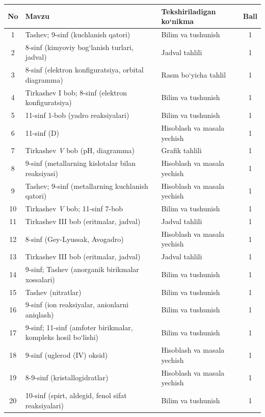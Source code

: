 \documentclass[11pt,a4paper]{article}
\begin{document}
{\small\noindent\begin{longtable}{|c|p{7.2cm}|p{5.4cm}|c|}\hline \textbf{No} & \textbf{Mavzu} & \textbf{Tekshiriladigan ko`nikma} & \textbf{Ball}\\\hline
1 & Tashev; 9-sinf (kuchlanish qatori) & Bilim va tushunish & 1\\\hline
2 & 8-sinf (kimyoviy bog`lanish turlari, jadval) & Jadval tahlili & 1\\\hline
3 & 8-sinf (elektron konfiguratsiya, orbital diagramma) & Rasm bo`yicha tahlil & 1\\\hline
4 & Tirkashev I bob; 8-sinf (elektron konfiguratsiya) & Bilim va tushunish & 1\\\hline
5 & 11-sinf 1-bob (yadro reaksiyalari) & Bilim va tushunish & 1\\\hline
6 & 11-sinf (D) & Hisoblash va masala yechish & 1\\\hline
7 & Tirkashev \textit{V} bob (pH, diagramma) & Grafik tahlili & 1\\\hline
8 & 9-sinf (metallarning kislotalar bilan reaksiyasi) & Hisoblash va masala yechish & 1\\\hline
9 & Tashev; 9-sinf (metallarning kuchlanish qatori) & Hisoblash va masala yechish & 1\\\hline
10 & Tirkashev \textit{V} bob; 11-sinf 7-bob & Bilim va tushunish & 1\\\hline
11 & Tirkashev III bob (eritmalar, jadval) & Jadval tahlili & 1\\\hline
12 & 8-sinf (Gey-Lyussak, Avogadro) & Hisoblash va masala yechish & 1\\\hline
13 & Tirkashev III bob (eritmalar, jadval) & Jadval tahlili & 1\\\hline
14 & 9-sinf; Tashev (anorganik birikmalar xossalari) & Bilim va tushunish & 1\\\hline
15 & Tashev (nitratlar) & Bilim va tushunish & 1\\\hline
16 & 9-sinf (ion reaksiyalar, anionlarni aniqlash) & Bilim va tushunish & 1\\\hline
17 & 9-sinf; 11-sinf (amfoter birikmalar, kompleks hosil bo`lishi) & Bilim va tushunish & 1\\\hline
18 & 9-sinf (uglerod (IV) oksid) & Hisoblash va masala yechish & 1\\\hline
19 & 8-9-sinf (kristallogidratlar) & Hisoblash va masala yechish & 1\\\hline
20 & 10-sinf (spirt, aldegid, fenol sifat reaksiyalari) & Bilim va tushunish & 1\\\hline

\end{longtable}}
\end{document}
